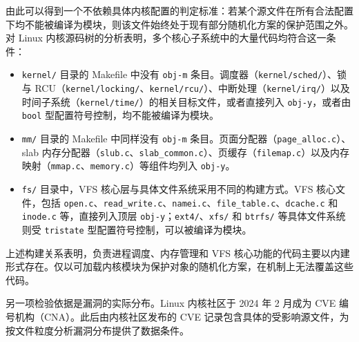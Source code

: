 由此可以得到一个不依赖具体内核配置的判定标准：若某个源文件在所有合法配置下均不能被编译为模块，则该文件始终处于现有部分随机化方案的保护范围之外。对 Linux 内核源码树的分析表明，多个核心子系统中的大量代码均符合这一条件：

\begin{itemize}
    \item \lstinline[breaklines=false]@kernel/@ 目录的 Makefile 中没有 \lstinline[breaklines=false]@obj-m@ 条目。调度器（\lstinline[breaklines=false]@kernel/sched/@）、锁与 RCU（\lstinline[breaklines=false]@kernel/locking/@、\lstinline[breaklines=false]@kernel/rcu/@）、中断处理（\lstinline[breaklines=false]@kernel/irq/@）以及时间子系统（\lstinline[breaklines=false]@kernel/time/@）的相关目标文件，或者直接列入 \lstinline[breaklines=false]@obj-y@，或者由 \lstinline[breaklines=false]@bool@ 型配置符号控制，均不能被编译为模块。
    
    \item \lstinline[breaklines=false]@mm/@ 目录的 Makefile 中同样没有 \lstinline[breaklines=false]@obj-m@ 条目。页面分配器（\lstinline[breaklines=false]@page_alloc.c@）、slab 内存分配器（\lstinline[breaklines=false]@slub.c@、\lstinline[breaklines=false]@slab_common.c@）、页缓存（\lstinline[breaklines=false]@filemap.c@）以及内存映射（\lstinline[breaklines=false]@mmap.c@、\lstinline[breaklines=false]@memory.c@）等组件均列入 \lstinline[breaklines=false]@obj-y@。
    
    \item \lstinline[breaklines=false]@fs/@ 目录中，VFS 核心层与具体文件系统采用不同的构建方式。VFS 核心文件，包括 \lstinline[breaklines=false]@open.c@、\lstinline[breaklines=false]@read_write.c@、\lstinline[breaklines=false]@namei.c@、\lstinline[breaklines=false]@file_table.c@、\lstinline[breaklines=false]@dcache.c@ 和 \lstinline[breaklines=false]@inode.c@ 等，直接列入顶层 \lstinline[breaklines=false]@obj-y@；\lstinline[breaklines=false]@ext4/@、\lstinline[breaklines=false]@xfs/@ 和 \lstinline[breaklines=false]@btrfs/@ 等具体文件系统则受 \lstinline[breaklines=false]@tristate@ 型配置符号控制，可以被编译为模块。
\end{itemize}

上述构建关系表明，负责进程调度、内存管理和 VFS 核心功能的代码主要以内建形式存在。仅以可加载内核模块为保护对象的随机化方案，在机制上无法覆盖这些代码。

另一项检验依据是漏洞的实际分布。Linux 内核社区于 2024 年 2 月成为 CVE 编号机构（CNA）。此后由内核社区发布的 CVE 记录包含具体的受影响源文件，为按文件粒度分析漏洞分布提供了数据条件。

